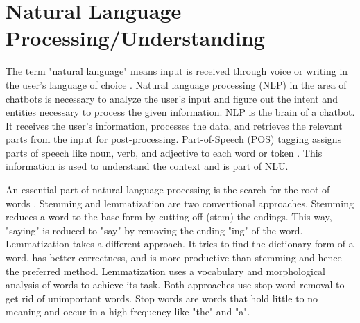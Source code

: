 \section{Natural Language Processing/Understanding}   
The term "natural language" means input is received through voice or writing in the user's language of choice \cite{buiildChatbotsPython}.
Natural language processing (NLP) in the area of chatbots is necessary to analyze the user's input and figure out the intent and entities necessary to process the given information. 
NLP is the brain of a chatbot.
It receives the user's information, processes the data, and retrieves the relevant parts from the input for post-processing.
Part-of-Speech (POS) tagging assigns parts of speech like noun, verb, and adjective to each word or token \cite{buiildChatbotsPython}.
This information is used to understand the context and is part of NLU.

An essential part of natural language processing is the search for the root of words \cite{buiildChatbotsPython}. 
Stemming and lemmatization are two conventional approaches.
Stemming reduces a word to the base form by cutting off (stem) the endings. 
This way, "saying" is reduced to "say" by removing the ending "ing" of the word.
Lemmatization takes a different approach. 
It tries to find the dictionary form of a word, has better correctness, and is more productive than stemming and hence the preferred method. 
Lemmatization uses a vocabulary and morphological analysis of words to achieve its task.
Both approaches use stop-word removal to get rid of unimportant words.
Stop words are words that hold little to no meaning and occur in a high frequency like "the" and "a".

